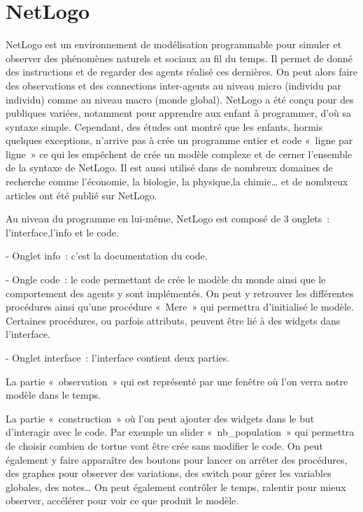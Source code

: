 \section{NetLogo}

NetLogo est un environnement de modélisation programmable pour simuler et observer des phénomènes naturels et sociaux au fil du temps. Il permet de donné des instructions et de regarder des agents réalisé ces dernières. On peut alors faire des observations et des connections inter-agents au niveau micro (individu par individu) comme au niveau macro (monde global).
NetLogo a été conçu pour des publiques variées, notamment pour apprendre aux enfant à programmer, d'où sa syntaxe simple. Cependant, des études ont montré que les enfants, hormis quelques exceptions, n'arrive pas à crée un programme entier et code « ligne par ligne » ce qui les empêchent de crée un modèle complexe et de cerner l'ensemble de la syntaxe de NetLogo.
Il est aussi utilisé dans de nombreux domaines de recherche comme l'économie, la biologie, la physique,la chimie… et de nombreux articles ont été publié sur NetLogo.




Au niveau du programme en lui-même, NetLogo est composé de 3 onglets : l'interface,l'info et le code.

- Onglet info : c'est la documentation du code.


- Ongle code : le code permettant de crée le modèle du monde ainsi que le comportement des agents y sont implémentés. On peut y retrouver les différentes procédures ainsi qu'une procédure « Mere » qui permettra d'initialisé le modèle. Certaines procédures, ou parfois attributs, peuvent être lié à des widgets dans l'interface.


- Onglet interface : l'interface contient deux parties.

		La partie « observation » qui est représenté par une fenêtre où l'on verra notre modèle dans le temps.

		La partie « construction » où l'on peut ajouter des widgets dans le but d’interagir avec le code. Par exemple un slider « nb_population » qui permettra de choisir combien de tortue vont être crée sans modifier le code. On peut également y faire apparaître des boutons pour lancer on arrêter des procédures, des graphes pour observer des variations, des switch pour gérer les variables globales, des notes… On peut également contrôler le temps, ralentir pour mieux observer, accélérer pour voir ce que produit le modèle.




